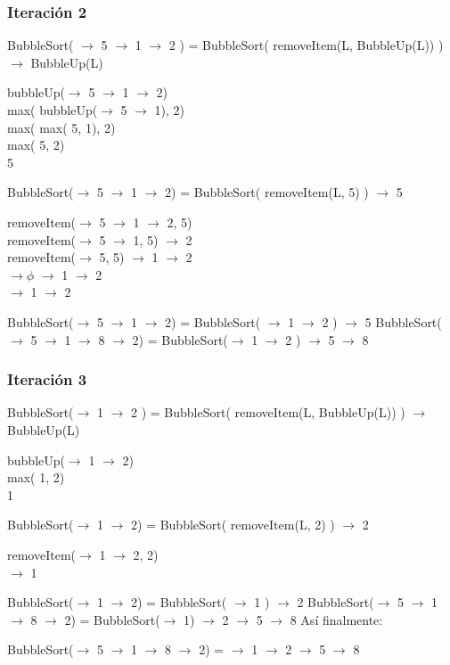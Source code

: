 \documentclass[11pt]{utalcaDoc}
\numberwithin{equation}{section}
\begin{document}
\subsubsection{Iteración 2}
 BubbleSort( $\to$ 5 $\to$ 1 $\to$ 2 ) = BubbleSort( removeItem(L, BubbleUp(L)) ) $\to$ BubbleUp(L)
 \begin{center}
   bubbleUp($\to$ 5 $\to$ 1 $\to$ 2)\\
   max( bubbleUp($\to$ 5 $\to$ 1), 2)\\
   max( max( 5, 1), 2)\\
   max( 5, 2)\\
   5\\
 \end{center}
 BubbleSort($\to$ 5 $\to$ 1 $\to$ 2) = BubbleSort( removeItem(L, 5) ) $\to$ 5
 \begin{center}
    removeItem($\to$ 5 $\to$ 1 $\to$ 2, 5)\\
    removeItem($\to$ 5 $\to$ 1, 5) $\to$ 2\\
    removeItem($\to$ 5, 5) $\to$ 1 $\to$ 2\\
    $\to\phi$ $\to$ 1 $\to$ 2\\
    $\to$ 1 $\to$ 2\\
 \end{center}
 BubbleSort($\to$ 5 $\to$ 1 $\to$ 2) = BubbleSort( $\to$ 1 $\to$ 2 ) $\to$ 5\newline
 BubbleSort($\to$ 5 $\to$ 1 $\to$ 8 $\to$ 2) = BubbleSort($\to$ 1 $\to$ 2 ) $\to$ 5 $\to$ 8
 
\subsubsection{Iteración 3}
 BubbleSort($\to$ 1 $\to$ 2 ) = BubbleSort( removeItem(L, BubbleUp(L)) ) $\to$ BubbleUp(L)
 \begin{center}
   bubbleUp($\to$ 1 $\to$ 2)\\
   max( 1, 2)\\
   1\\
 \end{center}
 BubbleSort($\to$ 1 $\to$ 2) = BubbleSort( removeItem(L, 2) ) $\to$ 2
 \begin{center}
    removeItem($\to$ 1 $\to$ 2, 2)\\
    $\to$ 1\\
 \end{center}
 BubbleSort($\to$ 1 $\to$ 2) = BubbleSort( $\to$ 1 ) $\to$ 2\newline
 BubbleSort($\to$ 5 $\to$ 1 $\to$ 8 $\to$ 2) = BubbleSort($\to$ 1) $\to$ 2 $\to$ 5 $\to$ 8\newline
 \newline
 Así finalmente:
 \begin{center}
     BubbleSort($\to$ 5 $\to$ 1 $\to$ 8 $\to$ 2) = $\to$ 1 $\to$ 2 $\to$ 5 $\to$ 8
 \end{center}
\end{document}
